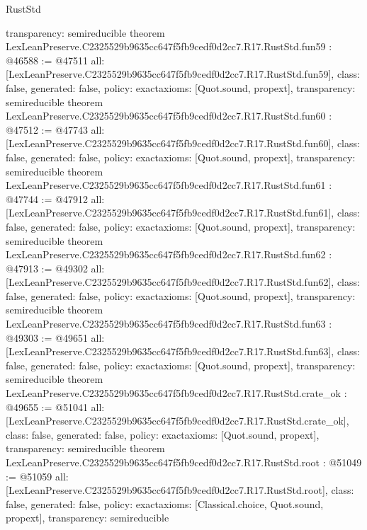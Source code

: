 \begin{lexlean}{RustStd}
\begin{coremodule}
{  transparency: semireducible
}
theorem LexLeanPreserve.C2325529b9635cc647f5fb9cedf0d2cc7.R17.RustStd.fun59 : @46588 := @47511 {
  all: [LexLeanPreserve.C2325529b9635cc647f5fb9cedf0d2cc7.R17.RustStd.fun59],
  class: false,
  generated: false,
  policy: exact{axioms: [Quot.sound, propext]},
  transparency: semireducible
}
theorem LexLeanPreserve.C2325529b9635cc647f5fb9cedf0d2cc7.R17.RustStd.fun60 : @47512 := @47743 {
  all: [LexLeanPreserve.C2325529b9635cc647f5fb9cedf0d2cc7.R17.RustStd.fun60],
  class: false,
  generated: false,
  policy: exact{axioms: [Quot.sound, propext]},
  transparency: semireducible
}
theorem LexLeanPreserve.C2325529b9635cc647f5fb9cedf0d2cc7.R17.RustStd.fun61 : @47744 := @47912 {
  all: [LexLeanPreserve.C2325529b9635cc647f5fb9cedf0d2cc7.R17.RustStd.fun61],
  class: false,
  generated: false,
  policy: exact{axioms: [Quot.sound, propext]},
  transparency: semireducible
}
theorem LexLeanPreserve.C2325529b9635cc647f5fb9cedf0d2cc7.R17.RustStd.fun62 : @47913 := @49302 {
  all: [LexLeanPreserve.C2325529b9635cc647f5fb9cedf0d2cc7.R17.RustStd.fun62],
  class: false,
  generated: false,
  policy: exact{axioms: [Quot.sound, propext]},
  transparency: semireducible
}
theorem LexLeanPreserve.C2325529b9635cc647f5fb9cedf0d2cc7.R17.RustStd.fun63 : @49303 := @49651 {
  all: [LexLeanPreserve.C2325529b9635cc647f5fb9cedf0d2cc7.R17.RustStd.fun63],
  class: false,
  generated: false,
  policy: exact{axioms: [Quot.sound, propext]},
  transparency: semireducible
}
theorem LexLeanPreserve.C2325529b9635cc647f5fb9cedf0d2cc7.R17.RustStd.crate_ok : @49655 := @51041 {
  all: [LexLeanPreserve.C2325529b9635cc647f5fb9cedf0d2cc7.R17.RustStd.crate_ok],
  class: false,
  generated: false,
  policy: exact{axioms: [Quot.sound, propext]},
  transparency: semireducible
}
theorem LexLeanPreserve.C2325529b9635cc647f5fb9cedf0d2cc7.R17.RustStd.root : @51049 := @51059 {
  all: [LexLeanPreserve.C2325529b9635cc647f5fb9cedf0d2cc7.R17.RustStd.root],
  class: false,
  generated: false,
  policy: exact{axioms: [Classical.choice, Quot.sound, propext]},
  transparency: semireducible
}


\end{coremodule}
\end{lexlean}
